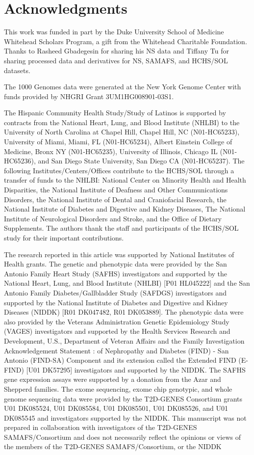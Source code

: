 \documentclass[11pt]{article}
\begin{document}
\section*{Acknowledgments}

This work was funded in part by the Duke University School of Medicine Whitehead Scholars Program, a gift from the Whitehead Charitable Foundation.
Thanks to Rasheed Gbadegesin for sharing his NS data and Tiffany Tu for sharing processed data and derivatives for NS, SAMAFS, and HCHS/SOL datasets.

The 1000 Genomes data were generated at the New York Genome Center with funds provided by NHGRI Grant 3UM1HG008901-03S1.

The Hispanic Community Health Study/Study of Latinos is supported by contracts from the National Heart, Lung, and Blood Institute (NHLBI) to the University of North Carolina at Chapel Hill, Chapel Hill, NC (N01-HC65233), University of Miami, Miami, FL (N01-HC65234), Albert Einstein College of Medicine, Bronx NY (N01-HC65235), University of Illinois, Chicago IL (N01-HC65236), and San Diego State University, San Diego CA (N01-HC65237). The following Institutes/Centers/Offices contribute to the HCHS/SOL through a transfer of funds to the NHLBI: National Center on Minority Health and Health Disparities, the National Institute of Deafness and Other Communications Disorders, the National Institute of Dental and Craniofacial Research, the National Institute of Diabetes and Digestive and Kidney Diseases, The National Institute of Neurological Disorders and Stroke, and the Office of Dietary Supplements. The authors thank the staff and participants of the HCHS/SOL study for their important contributions.

The research reported in this article was supported by National Institutes of Health grants. The genetic and phenotypic data were provided by the San Antonio Family Heart Study (SAFHS) investigators and supported by the National Heart, Lung, and Blood Institute (NHLBI) [P01 HL045222] and the San Antonio Family Diabetes/Gallbladder Study (SAFDGS) investigators and supported by the National Institute of Diabetes and Digestive and Kidney Diseases (NIDDK) [R01 DK047482, R01 DK053889]. The phenotypic data were also provided by the Veterans Administration Genetic Epidemiology Study (VAGES) investigators and supported by the Health Services Research and Development, U.S., Department of Veteran Affairs and the Family Investigation Acknowledgement Statement : of Nephropathy and Diabetes (FIND) - San Antonio (FIND-SA) Component and its extension called the Extended FIND (E-FIND) [U01 DK57295] investigators and supported by the NIDDK. The SAFHS gene expression assays were supported by a donation from the Azar and Shepperd families. The exome sequencing, exome chip genotypic, and whole genome sequencing data were provided by the T2D-GENES Consortium grants U01 DK085524, U01 DK085584, U01 DK085501, U01 DK085526, and U01 DK085545 and investigators supported by the NIDDK. This manuscript was not prepared in collaboration with investigators of the T2D-GENES SAMAFS/Consortium and does not necessarily reflect the opinions or views of the members of the T2D-GENES SAMAFS/Consortium, or the NIDDK
\end{document}
